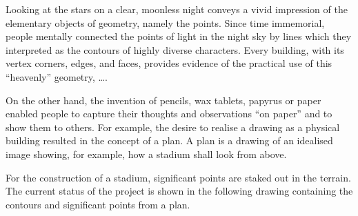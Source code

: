 \begin{MIntro}


Looking at the stars on a clear, moonless night conveys a vivid impression of the 
elementary objects of geometry, namely the points. Since time immemorial, people mentally 
connected the points of light in the night sky by lines which they interpreted 
as the contours of highly diverse characters. Every building, with its vertex corners, 
edges, and faces, provides evidence of the practical use of this ``heavenly'' geometry, \ldots.

On the other hand, the invention of pencils, wax tablets, papyrus or paper enabled
people to capture their thoughts and observations ``on paper'' and to show them to
others. For example, the desire to realise a drawing as a physical building resulted in the 
concept of a plan. A plan is a drawing of an idealised image showing, for example, how 
a stadium shall look from above.

For the construction of a stadium, significant points are staked out in the terrain. The 
current status of the project is shown in the following drawing containing the contours and 
significant points from a plan. 



\end{MIntro}
